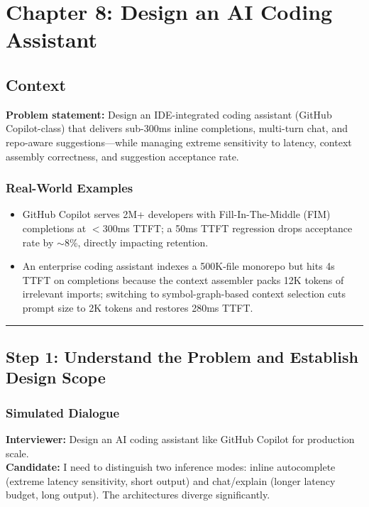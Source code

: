 \chapter{Chapter 8: Design an AI Coding Assistant}

\section*{Context}

\textbf{Problem statement:} Design an IDE-integrated coding assistant (GitHub Copilot-class) that delivers sub-300ms inline completions, multi-turn chat, and repo-aware suggestions---while managing extreme sensitivity to latency, context assembly correctness, and suggestion acceptance rate.

\subsection*{Real-World Examples}

\begin{itemize}
  \item GitHub Copilot serves 2M+ developers with Fill-In-The-Middle (FIM) completions at $<$300ms TTFT; a 50ms TTFT regression drops acceptance rate by $\sim$8\%, directly impacting retention.
  \item An enterprise coding assistant indexes a 500K-file monorepo but hits 4s TTFT on completions because the context assembler packs 12K tokens of irrelevant imports; switching to symbol-graph-based context selection cuts prompt size to 2K tokens and restores 280ms TTFT.
\end{itemize}

\bigskip\hrule\bigskip

\section*{Step 1: Understand the Problem and Establish Design Scope}

\subsection*{Simulated Dialogue}

\textbf{Interviewer:} Design an AI coding assistant like GitHub Copilot for production scale.\\
\textbf{Candidate:} I need to distinguish two inference modes: inline autocomplete (extreme latency sensitivity, short output) and chat/explain (longer latency budget, long output). The architectures diverge significantly.

